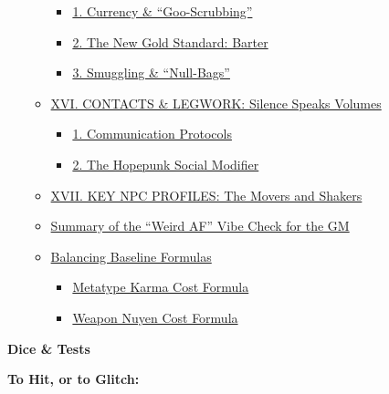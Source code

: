 \documentclass[
  oneside]{article}
\providecommand{\tightlist}{%
  \setlength{\itemsep}{0pt}\setlength{\parskip}{0pt}}
\begin{document}
\begin{multicols}{2}
\begin{itemize}
\begin{itemize}
    \begin{itemize}
    \tightlist
    \item
      \protect\hyperlink{1-currency--goo-scrubbing}{1.
      Currency \& ``Goo-Scrubbing''}
    \item
      \protect\hyperlink{2-the-new-gold-standard-barter}{2.
      The New Gold Standard: Barter}
    \item
      \protect\hyperlink{3-smuggling--null-bags}{3.
      Smuggling \& ``Null-Bags''}
    \end{itemize}
  \item
    \protect\hyperlink{xvi-contacts--legwork-silence-speaks-volumes}{XVI.
    CONTACTS \& LEGWORK: Silence Speaks Volumes}

    \begin{itemize}
    \tightlist
    \item
      \protect\hyperlink{1-communication-protocols}{1.
      Communication Protocols}
    \item
      \protect\hyperlink{2-the-hopepunk-social-modifier}{2.
      The Hopepunk Social Modifier}
    \end{itemize}
  \item
    \protect\hyperlink{xvii-key-npc-profiles-the-movers-and-shakers}{XVII.
    KEY NPC PROFILES: The Movers and Shakers}
  \item
    \protect\hyperlink{summary-of-the-weird-af-vibe-check-for-the-gm}{Summary
    of the ``Weird AF'' Vibe Check for the GM}
  \item
    \protect\hyperlink{balancing-baseline-formulas}{Balancing
    Baseline Formulas}

    \begin{itemize}
    \tightlist
    \item
      \protect\hyperlink{metatype-karma-cost-formula}{Metatype
      Karma Cost Formula}
    \item
      \protect\hyperlink{weapon-nuyen-cost-formula}{Weapon
      Nuyen Cost Formula}
    \end{itemize}
  \end{itemize}
\end{itemize}

\textbf{Dice \& Tests}

\textbf{To Hit, or to Glitch:}


\end{multicols}
\end{document}
